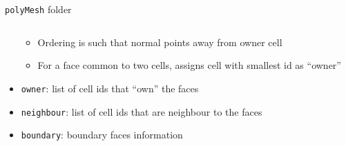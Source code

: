 \begin{frame}{\texttt{polyMesh} folder}
\begin{columns}
\begin{column}{0.5\linewidth}
\begin{itemize}
\begin{itemize}
                    \item Ordering is such that normal points away from \alert{owner} cell
                    \item For a face common to two cells, \openfoam{} assigns cell with smallest id as ``owner''
                \end{itemize}
                \item \texttt{owner}: list of cell ids that ``own'' the faces
                \item \texttt{neighbour}: list of cell ids that are neighbour to the faces
                \item \texttt{boundary}: boundary faces information
            \end{itemize}
        \end{column}
    \end{columns}
\end{frame}

